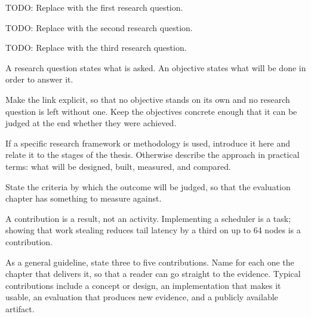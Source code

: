 \begin{ThesisResearchQuestions}
  \item\label{rq:example-one} TODO: Replace with the first research question.
  \item\label{rq:example-two} TODO: Replace with the second research question.
  \item\label{rq:example-three} TODO: Replace with the third research question.
\end{ThesisResearchQuestions}

%
A research question states what is asked.
An objective states what will be done in order to answer it.

Make the link explicit, so that no objective stands on its own and no research question is left without one.
Keep the objectives concrete enough that it can be judged at the end whether they were achieved.


If a specific research framework or methodology is used, introduce it here and relate it to the stages of the thesis.
Otherwise describe the approach in practical terms: what will be designed, built, measured, and compared.

State the criteria by which the outcome will be judged, so that the evaluation chapter has something to measure against.


A contribution is a result, not an activity.
Implementing a scheduler is a task; showing that work stealing reduces tail latency by a third on up to 64 nodes is a contribution.

As a general guideline, state three to five contributions.
Name for each one the chapter that delivers it, so that a reader can go straight to the evidence.
Typical contributions include a concept or design, an implementation that makes it usable, an evaluation that produces new evidence, and a publicly available artifact.

